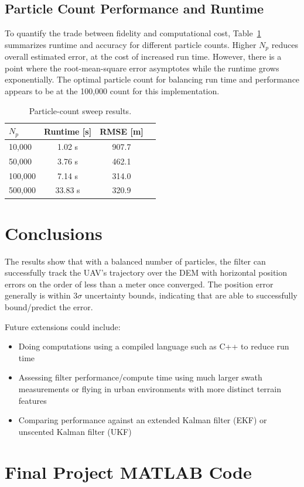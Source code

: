 \documentclass[conference]{IEEEtran}
\begin{document}
\subsection{Particle Count Performance and Runtime}
To quantify the trade between fidelity and computational cost, Table~\ref{tab:particle_sweep} summarizes runtime and accuracy for different particle counts. Higher $N_p$ reduces overall estimated error, at the cost of increased run time. However, there is a point where the root-mean-square error asymptotes while the runtime grows exponentially. The optimal particle count for balancing run time and performance appears to be at the 100,000 count for this implementation.

\begin{table}[t]
  \centering
  \caption{Particle-count sweep results.}
  \label{tab:particle_sweep}
  \begin{tabular}{lccc}
    \hline
    $N_p$ & Runtime [s] & RMSE [m] \\
    \hline
    10{,}000 & 1.02 s  & 907.7 \\
    50{,}000 & 3.76 s  & 462.1 \\
    100{,}000 & 7.14 s & 314.0 \\
    500{,}000 & 33.83 s & 320.9 \\
    \hline
  \end{tabular}
\end{table}

\section{Conclusions}
The results show that with a balanced number of particles, the filter can successfully track the UAV's trajectory over the DEM  with horizontal position errors on the order of less than a meter once converged. The position error generally is within $3\sigma$ uncertainty bounds, indicating that are able to successfully bound/predict the error.

Future extensions could include:
\begin{itemize}
  \item Doing computations using a compiled language such as C++ to reduce run time
  \item Assessing filter performance/compute time using much larger swath measurements or flying in urban environments with more distinct terrain features
  \item Comparing performance against an extended Kalman filter (EKF) or unscented Kalman filter (UKF)
\end{itemize}





\clearpage
\onecolumn
\appendices
\section{Final Project MATLAB Code}



\end{document}
